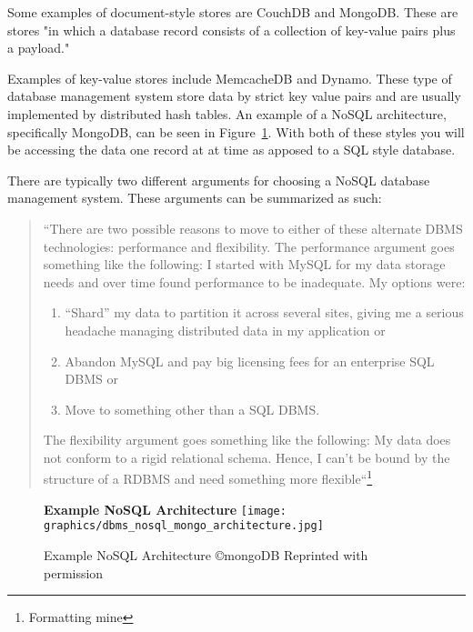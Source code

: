 \documentclass[letterpaper, 12pt]{article}
\begin{document}
Some examples of document-style stores are CouchDB and MongoDB. These are stores
"in which a database record consists of a collection of key-value pairs plus a payload."
\cite{stonebraker2010sql}
\par\vspace{\baselineskip}
Examples of key-value stores include MemcacheDB and Dynamo. These type of database
management system store data by strict key value pairs and are usually implemented by
distributed hash tables. An example of a NoSQL architecture, specifically MongoDB,
can be seen in Figure~\ref{fig:nosqlDBMS_structure}. With both of these styles you 
will be accessing the data one record at at time as apposed to a SQL style database.
\par\vspace{\baselineskip}
There are typically two different arguments for choosing a NoSQL database management
system. These arguments can be summarized as such:
\begin{quote}
``There are two possible reasons
to move to either of these alternate
DBMS technologies: performance and
flexibility.
The performance argument goes
something like the following: I started
with MySQL for my data storage needs
and over time found performance to be
inadequate. My options were:

\begin{enumerate}
  \item “Shard” my data to partition it
across several sites, giving me a serious
headache managing distributed data
in my application or
  \item Abandon MySQL and pay big licensing
fees for an enterprise SQL
DBMS or
\item Move to something other
than a SQL DBMS.
\end{enumerate}

The flexibility argument goes something
like the following: My data does
not conform to a rigid relational schema.
Hence, I can’t be bound by the
structure of a RDBMS and need something
more flexible``\cite{stonebraker2010sql}\footnote{Formatting mine}
\end{quote} 
\par\vspace{\baselineskip}

\begin{figure}[H]
  \centering
  \textbf{Example NoSQL Architecture}
  \texttt{[image: graphics/dbms\_nosql\_mongo\_architecture.jpg]}
  \caption{Example NoSQL Architecture \copyright mongoDB   \citep{mongodb_architecture} Reprinted with permission}
  \label{fig:nosqlDBMS_structure}
\end{figure}
\newpage
\end{document}
